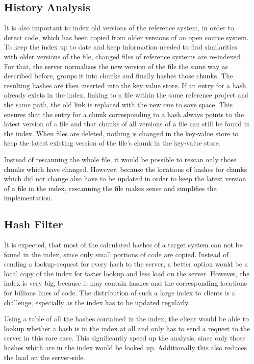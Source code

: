 \subsection{History Analysis}\label{section:approach/creating_index/history_analysis}
It is also important to index old versions of the reference system, in order to detect code, which has been copied from older versions of an open source system.
To keep the index up to date and keep information needed to find similarities with older versions of the file, changed files of reference systems are re-indexed.
For that, the server normalizes the new version of the file the same way as described before, groups it into chunks and finally hashes those chunks.
The resulting hashes are then inserted into the key value store.
If an entry for a hash already exists in the index, linking to a file within the same reference project and the same path, the old link is replaced with the new one to save space.
This ensures that the entry for a chunk corresponding to a hash always points to the latest version of a file and that chunks of all versions of a file can still be found in the index.
When files are deleted, nothing is changed in the key-value store to keep the latest existing version of the file's chunk in the key-value store.

Instead of rescanning the whole file, it would be possible to rescan only those chunks which have changed.
However, because the locations of hashes for chunks which did not change also have to be updated in order to keep the latest version of a file in the index, rescanning the file makes sense and simplifies the implementation.

\subsection{Hash Filter}\label{section:approach/creating_index/hash_filter}
It is expected, that most of the calculated hashes of a target system can not be found in the index, since only small portions of code are copied.
Instead of sending a lookup-request for every hash to the server, a better option would be a local copy of the index for faster lookup and less load on the server.
However, the index is very big, because it may contain hashes and the corresponding locations for billions lines of code.
The distribution of such a large index to clients is a challenge, especially as the index has to be updated regularly.

Using a table of all the hashes contained in the index, the client would be able to lookup whether a hash is in the index at all and only has to send a request to the server in this rare case.
This significantly speed up the analysis, since only those hashes which are in the index would be looked up.
Additionally this also reduces the load on the server-side.

